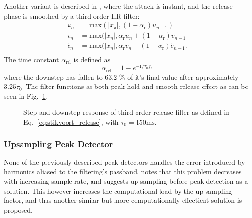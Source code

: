 \documentclass[../main2.tex]{subfiles}
\providecommand{\rootdir}{..}
\begin{document}
Another variant is described in \cite{stikvoort1986digital}, where the attack is instant, and the release phase is smoothed by a third order IIR filter:\begin{equation}\label{eq:stikvoort_release}
\begin{split}
u_n &= \text{max}(|x_n|, (1-\alpha_{\text{r}}) u_{n-1}) \\
v_n &= \text{max}(|x_n|, \alpha_{\text{r}} u_n + (1-\alpha_{\text{r}}) v_{n-1} \\
\tilde{e}_n &= \text{max}(|x_n|, \alpha_{\text{r}} v_n + (1-\alpha_{\text{r}}) \tilde{e}_{n-1}. \\
\end{split}
\end{equation}
The time constant $\alpha_{\text{rel}}$ is defined as
\begin{equation}
\alpha_\text{rel} = 1-e^{-1/\tau_0 f_s}
\end{equation}
where the downstep has fallen to 63.2 \% of it's final value after approximately $3.25 \tau_0$. The filter functions as both peak-hold and smooth release effect as can be seen in Fig.~\ref{fig:step_stikvoort_release}.
\begin{figure}
\centerline{}
\caption{Step and downstep response of third order release filter as defined in Eq.~\eqref{eq:stikvoort_release}, with $\tau_0 = 150 \text{ms}$.}
\label{fig:step_stikvoort_release}
\end{figure}

\subsubsection{Upsampling Peak Detector}
None of the previously described peak detectors handles the error introduced by harmonics aliased to the filtering's passband. \cite{frindle1996implementation} notes that this problem decreases with increasing sample rate, and suggests up-sampling before peak detection as a solution. This however increases the computational load by the up-sampling factor, and thus another similar but more computationally effectient solution is proposed.
\end{document}
